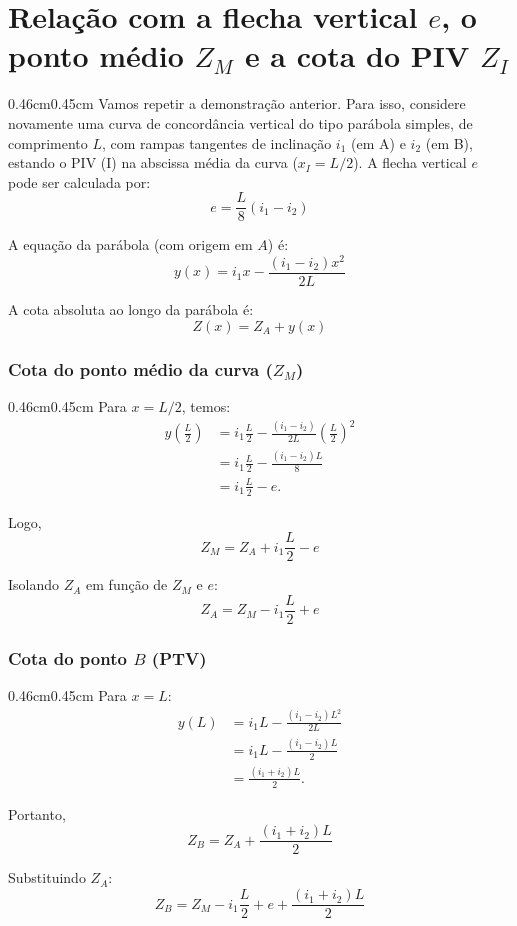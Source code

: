 \documentclass[12pt,letterpaper]{article}
\newenvironment{corpo}{\begin{adjustwidth}{0.46cm}{0.45cm}\justifying}{\end{adjustwidth}}
\begin{document}
\section*{Relação com a flecha vertical $e$, o ponto médio $Z_M$ e a cota do PIV $Z_I$}

\begin{corpo}
Vamos repetir a demonstração anterior. Para isso, considere novamente uma curva de concordância vertical do tipo parábola simples, de comprimento $L$, com rampas tangentes de inclinação $i_1$ (em A) e $i_2$ (em B), estando o PIV (I) na abscissa média da curva ($x_I=L/2$). A flecha vertical $e$ pode ser calculada por:
\[
 e=\frac{L}{8}(i_1-i_2)
\]

A equação da parábola (com origem em $A$) é:
\[
 y(x)=i_1x-\frac{(i_1-i_2)x^2}{2L}
\]

A cota absoluta ao longo da parábola é:
\[
 Z(x)=Z_A+y(x)
\]
\end{corpo}

\subsubsection*{Cota do ponto médio da curva ($Z_M$)}

\begin{corpo}
Para $x=L/2$, temos:
\[
\begin{aligned}
y\left(\frac{L}{2}\right)
&=i_1\frac{L}{2}-\frac{(i_1-i_2)}{2L}\left(\frac{L}{2}\right)^2 \\
&=i_1\frac{L}{2}-\frac{(i_1-i_2)L}{8} \\
&=i_1\frac{L}{2}-e.
\end{aligned}
\]

Logo,
\[
 Z_M=Z_A+i_1\frac{L}{2}-e
\]

Isolando $Z_A$ em função de $Z_M$ e $e$:
\[
 Z_A=Z_M-i_1\frac{L}{2}+e
\]
\end{corpo}

\subsubsection*{Cota do ponto $B$ (PTV)}

\begin{corpo}
Para $x=L$:
\[
\begin{aligned}
y(L)&=i_1L-\frac{(i_1-i_2)L^2}{2L} \\
&=i_1L-\frac{(i_1-i_2)L}{2} \\
&=\frac{(i_1+i_2)L}{2}.
\end{aligned}
\]

Portanto,
\[
 Z_B=Z_A+\frac{(i_1+i_2)L}{2}
\]

Substituindo $Z_A$:
\[
 Z_B=Z_M-i_1\frac{L}{2}+e+\frac{(i_1+i_2)L}{2}
\]
\end{corpo}
\end{document}
